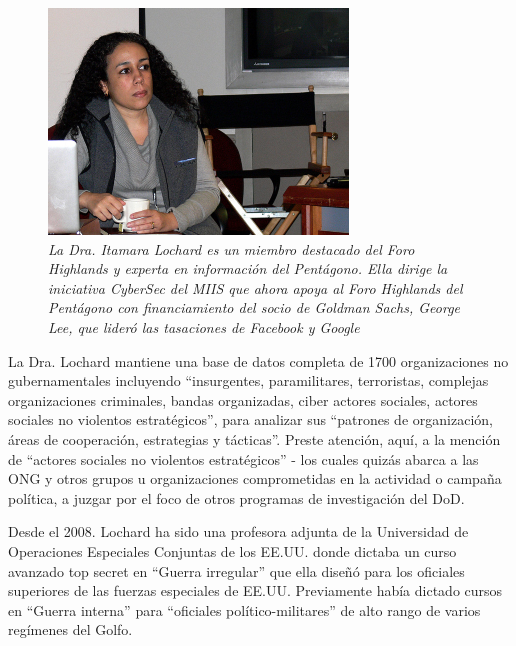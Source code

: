 \documentclass[10pt,a5paper,twoside,spanish,]{book}
\begin{document}
\begin{figure}[htbp]
\centering
\includegraphics{1.9.png}
\caption{\emph{La Dra. Itamara Lochard es un miembro destacado del Foro
Highlands y experta en información del Pentágono. Ella dirige la
iniciativa CyberSec del MIIS que ahora apoya al Foro Highlands del
Pentágono con financiamiento del socio de Goldman Sachs, George Lee, que
lideró las tasaciones de Facebook y Google}}
\end{figure}

La Dra. Lochard mantiene una base de datos completa de 1700
organizaciones no gubernamentales incluyendo ``insurgentes,
paramilitares, terroristas, complejas organizaciones criminales, bandas
organizadas, ciber actores sociales, actores sociales no violentos
estratégicos'', para analizar sus ``patrones de organización, áreas de
cooperación, estrategias y tácticas''. Preste atención, aquí, a la
mención de ``actores sociales no violentos estratégicos'' - los cuales
quizás abarca a las ONG y otros grupos u organizaciones comprometidas en
la actividad o campaña política, a juzgar por el foco de otros programas
de investigación del DoD.

Desde el 2008. Lochard ha sido una profesora adjunta de la Universidad
de Operaciones Especiales Conjuntas de los EE.UU. donde dictaba un curso
avanzado top secret en ``Guerra irregular'' que ella diseñó para los
oficiales superiores de las fuerzas especiales de EE.UU. Previamente
había dictado cursos en ``Guerra interna'' para ``oficiales
político-militares'' de alto rango de varios regímenes del Golfo.
\end{document}
